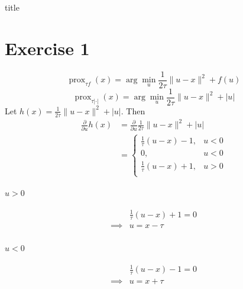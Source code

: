 \documentclass[12pt]{article}
\begin{document}
{title}

\tableofcontents




\section{Exercise 1}
\begin{equation}
  \operatorname{prox}_{\tau f}(x) = \arg\min_{u} \frac{1}{2\tau}\|u-x\|^2 + f(u)
\end{equation}
\begin{equation}
  \operatorname{prox}_{\tau |\cdot|}(x) = \arg\min_{u} \frac{1}{2\tau}\|u-x\|^2 + |u|
\end{equation}
\begin{equation}
\end{equation}
Let $h(x) = \frac{1}{2\tau}\|u-x\|^2 + |u|$. Then
\begin{align*}
  \frac{\partial}{\partial u} h(x)
   & = \frac{\partial}{\partial u} \frac{1}{2\tau}\|u-x\|^2 + |u| \\
   & =
  \begin{cases}
    \frac{1}{\tau}(u-x) - 1,  & u < 0 \\
    0,                        & u < 0 \\
    \frac{1}{\tau} (u-x) + 1, & u > 0 \\
  \end{cases}
\end{align*}
\paragraph{$u > 0$}
\begin{align*}
           &
  \frac{1}{\tau} (u-x) + 1 = 0 \\
  \implies &
  u = x - \tau                 \\
\end{align*}
\paragraph{$u < 0$}
\begin{align*}
           &
  \frac{1}{\tau} (u-x) - 1 = 0 \\
  \implies &
  u = x + \tau                 \\
\end{align*}
\end{document}
